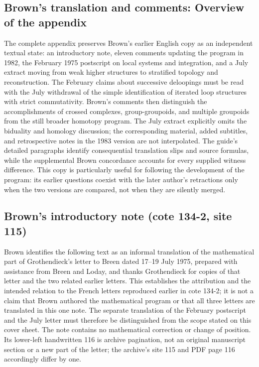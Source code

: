 \subsection*{Brown's translation and comments: Overview of the appendix}
The complete appendix preserves Brown's earlier English copy as an independent textual state: an introductory note, eleven comments updating the program in 1982, the February 1975 postscript on local systems and integration, and a July extract moving from weak higher structures to stratified topology and reconstruction. The February claims about successive deloopings must be read with the July withdrawal of the simple identification of iterated loop structures with strict commutativity. Brown's comments then distinguish the accomplishments of crossed complexes, group-groupoids, and multiple groupoids from the still broader homotopy program. The July extract explicitly omits the biduality and homology discussion; the corresponding material, added subtitles, and retrospective notes in the 1983 version are not interpolated. The guide's detailed paragraphs identify consequential translation slips and source formulas, while the supplemental Brown concordance accounts for every supplied witness difference. This copy is particularly useful for following the development of the program: its earlier questions coexist with the later author's retractions only when the two versions are compared, not when they are silently merged.

\subsection*{Brown's introductory note (cote 134-2, site 115)}
Brown identifies the following text as an informal translation of the mathematical part of Grothendieck's letter to Breen dated 17--19 July 1975, prepared with assistance from Breen and Loday, and thanks Grothendieck for copies of that letter and the two related earlier letters. This establishes the attribution and the intended relation to the French letters reproduced earlier in cote 134-2; it is not a claim that Brown authored the mathematical program or that all three letters are translated in this one note. The separate translation of the February postscript and the July letter must therefore be distinguished from the scope stated on this cover sheet. The note contains no mathematical correction or change of position. Its lower-left handwritten 116 is archive pagination, not an original manuscript section or a new part of the letter; the archive's site 115 and PDF page 116 accordingly differ by one.

